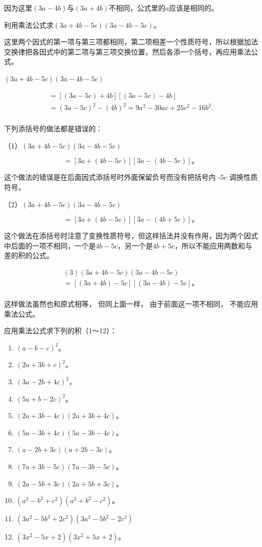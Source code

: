 因为这里\((3a - 4b)\)与\((3a + 4b)\)不相同，公式里的\(a\)应该是相同的。

 利用乘法公式求\((3a+4b-5c)(3a-4b-5c)\)。

这里两个因式的第一项与第三项都相同，第二项相差一个性质符号，所以根据加法交换律把各因式中的第二项与第三项交换位置，然后各添一个括号，再应用乘法公式。

\((3a + 4b - 5c)(3a - 4b - 5c)\)

\[
\begin{array}{l} = [ (3 a - 5 c) + 4 b ] [ (3 a - 5 c) - 4 b ] \\ = (3 a - 5 c) ^{2} - (4 b) ^{2} = 9 a ^{2} - 30 a c + 25 c ^{2} - 16 b ^{2}. \\ \end{array}
\]

 下列添括号的做法都是错误的：

（1）\((3a + 4b - 5c)(3a - 4b - 5c)\)

\[
= [ 3 a + (4 b - 5 c) ] [ 3 a - (4 b - 5 c) ]\text{。}
\]

这个做法的错误是在后面因式添括号时外面保留负号而没有把括号内 -5c
调换性质符号。

（2）\((3a + 4b - 5c)(3a - 4b - 5c)\)

\[
= [ 3 a + (4 b - 5 c) ] [ 3 a - (4 b + 5 c) ]\text{。}
\]

这个做法在添括号时注意了变换性质符号，但这样括法并没有作用，因为两个因式中后面的一项不相同，一个是\(4b - 5c\)，另一个是\(4b + 5c\)，所以不能应用两数和与差的积的公式。

\[
\begin{array}{l} (3) (3 a + 4 b - 5 c) (3 a - 4 b - 5 c) \\ = [ (3 a + 4 b) - 5 c ] [ (3 a - 4 b) - 5 c ]\text{。} \\ \end{array}
\]

这样做法虽然也和原式相等， 但同上面一样， 由于前面这一项不相同，
不能应用乘法公式。

应用乘法公式求下列的积（1～12）：

\begin{enumerate}[start=1]
\item
  \((a - b - c)^{2}\)。
\item
  \((2a + 3b + c)^{2}\)。
\item
  \((3a - 2b + 4c)^{2}\)，
\item
  \((5a + b - 2c)^{2}\)。
\item
  \((2a + 3b - 4c)(2a + 3b + 4c)\)。
\item
  \((5a - 3b + 4c)(5a - 3b - 4c)\)。
\item
  \((a - 2b + 3c)(a + 2b - 3c)\)。
\item
  \((7a + 3b - 5c)(7a - 3b - 5c)\)。
\item
  \((2a - 5b + 3c)(2a + 5b + 3c)\)。
\item
  \((a^2 - b^2 + c^2)(a^2 + b^2 - c^2)\)。
\item
  \((3a^{2} - 5b^{2} + 2c^{2})(3a^{2} - 5b^{2} - 2c^{2})\)
\item
  \((3x^{2} - 5x + 2)(3x^{2} + 5x + 2)\)。
\end{enumerate}

